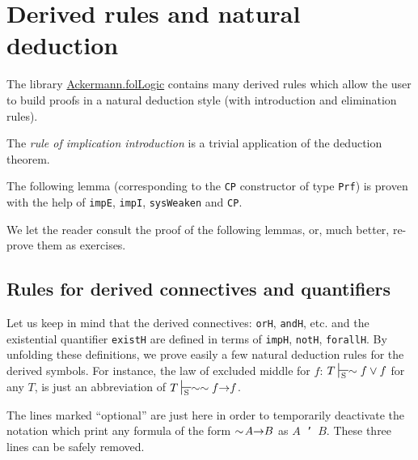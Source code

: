 \section{Derived rules and natural deduction}


 The library 
 \href{../theories/html/hydras.Ackermann.folLogic.html}{Ackermann.folLogic} contains many derived rules which allow the user to build proofs in a natural deduction style (with introduction and elimination rules).


The \emph{rule of implication introduction} is a trivial application of the deduction theorem.


The following lemma (corresponding to the \texttt{CP} constructor of type \texttt{Prf}) is proven with the help of \texttt{impE}, \texttt{impI}, 
\texttt{sysWeaken} and \texttt{CP}.  


We let the reader consult the proof of the following lemmas, or, much better, re-prove them as exercises.





\subsection{Rules for derived connectives and quantifiers}

Let us keep in mind that the derived connectives: \texttt{orH}, \texttt{andH}, etc. and the existential quantifier \texttt{existH}  are defined
in terms of \texttt{impH}, \texttt{notH}, \texttt{forallH}.
By unfolding these definitions, we prove easily a few natural deduction rules for the derived symbols. 
For instance, the law of excluded middle for $f$: $ T\sdash \sim f \vee f$
for any $T$,  is just an abbreviation of $T \sdash \sim\sim{}f \arrow f$.



\begin{remark}
  The lines marked ``optional'' are just here in order to
temporarily deactivate the notation which print any formula 
of the form $\sim{}\!A \mbox{$\rightarrow$} B$ as \texttt{$A$ \disj' $B$}.
 These three lines can be safely removed.
\end{remark}


